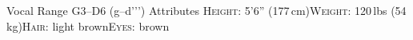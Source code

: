 \begin{cvskills}
  \cvskill
    {Vocal Range}%
    {G3--D6 (g--d{'}{'}{'})}%
  \cvskill
    {Attributes}%
    {{\scshape Height}: 5'6'' (177\,cm){\enskip\cdotp\enskip}{\scshape Weight}: 120\,lbs (54\,kg){\enskip\cdotp\enskip}{\scshape Hair}: light brown{\enskip\cdotp\enskip}{\scshape Eyes}: brown}%
\end{cvskills}
